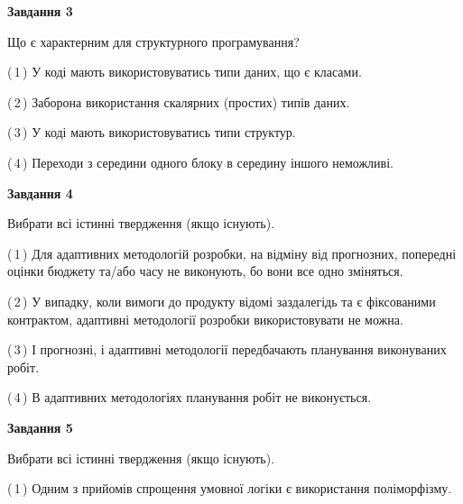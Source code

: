 \documentclass[10pt, ukrainian]{article}
\begin{document}
{\begin {large}
{\begin {center}\textbf{Завдання 3}\end {center}}\par
Що є характерним для структурного програмування?\par
\vspace{2mm}



(\,1\,) У коді мають використовуватись типи даних, що є класами. %



(\,2\,) Заборона використання скалярних (простих) типів даних. %



(\,3\,) У коді мають використовуватись типи структур. %



(\,4\,) Переходи з середини одного блоку в середину іншого неможливі. %


{\begin {center}\textbf{Завдання 4}\end {center}}\par
Вибрати всі істинні твердження (якщо існують).\par
\vspace{2mm}



(\,1\,) Для адаптивних методологій розробки, на відміну від прогнозних, попередні оцінки бюджету та/або часу не виконують, бо вони все одно зміняться. %



(\,2\,) У випадку, коли вимоги до продукту відомі заздалегідь та є фіксованими контрактом, адаптивні методології розробки використовувати не можна. %



(\,3\,) І прогнозні, і адаптивні методології передбачають планування виконуваних робіт. %



(\,4\,) В адаптивних методологіях планування робіт не виконується. %


{\begin {center}\textbf{Завдання 5}\end {center}}\par
Вибрати всі істинні твердження (якщо існують).\par
\vspace{2mm}



(\,1\,) Одним з прийомів спрощення умовної логіки є використання поліморфізму. %




\end{large}}
\end{document}
